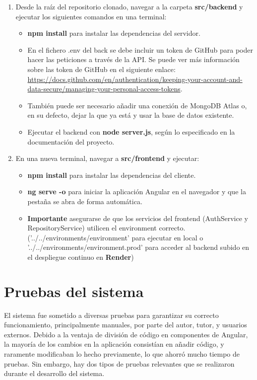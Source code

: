 \begin{enumerate}

	\item Desde la raíz del repositorio clonado, navegar a la carpeta \textbf{src/backend} y ejecutar los siguientes comandos en una terminal:
	\begin{itemize}
		\item \textbf{npm install} para instalar las dependencias del servidor.
		\item En el fichero .env del back se debe incluir un token de GitHub para poder hacer las peticiones a través de la API. Se puede ver más información sobre las token de GitHub en el siguiente enlace: \url{https://docs.github.com/en/authentication/keeping-your-account-and-data-secure/managing-your-personal-access-tokens}. 
        \item También puede ser necesario añadir una conexión de MongoDB Atlas o, en su defecto, dejar la que ya está y usar la base de datos existente.
		\item Ejecutar el backend con \textbf{node server.js}, según lo especificado en la documentación del proyecto.
	\end{itemize}

	\item En una nueva terminal, navegar a \textbf{src/frontend} y ejecutar:
	\begin{itemize}
		\item \textbf{npm install} para instalar las dependencias del cliente.
		\item \textbf{ng serve -o} para iniciar la aplicación Angular en el navegador y que la pestaña se abra de forma automática.
        \item \textbf{Importante} asegurarse de que los servicios del frontend (AuthService y RepositoryService) utilicen el environment correcto. ('../../environments/environment' para ejecutar en local o '../../environments/environment.prod' para acceder al backend subido en el despliegue continuo en \textbf{Render})
	\end{itemize}
\end{enumerate}

\section{Pruebas del sistema}

El sistema fue sometido a diversas pruebas para garantizar su correcto funcionamiento, principalmente manuales, por parte del autor, tutor, y usuarios externos. Debido a la ventaja de división de código en componentes de Angular, la mayoría de los cambios en la aplicación consistían en añadir código, y raramente modificaban lo hecho previamente, lo que ahorró mucho tiempo de pruebas. Sin embargo, hay dos tipos de pruebas relevantes que se realizaron durante el desarrollo del sistema.

